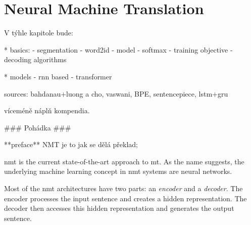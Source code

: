 \chapter{Neural Machine Translation}
\label{chap:nmt}

\begin{markdown}
V týhle kapitole bude:

* basics:
    - segmentation
    - word2id
    - model
    - softmax
    - training objective
    - decoding algorithms

* models
    - rnn based
    - transformer

sources:
bahdanau+luong a cho, vaswani, BPE, sentencepiece, lstm+gru

víceméně náplň kompendia.


### Pohádka ###

**preface**
\gls{NMT} je to jak se dělá překlad;


\end{markdown}


\gls{nmt} is the current state-of-the-art approach to \gls{mt}. As the name
suggests, the underlying machine learning concept in \gls{nmt} systems are
neural networks.

Most of the \gls{nmt} architectures have two parts: an \emph{encoder} and a
\emph{decoder}. The encoder processes the input sentence and creates a hidden
representation. The decoder then accesses this hidden representation and
generates the output sentence.
